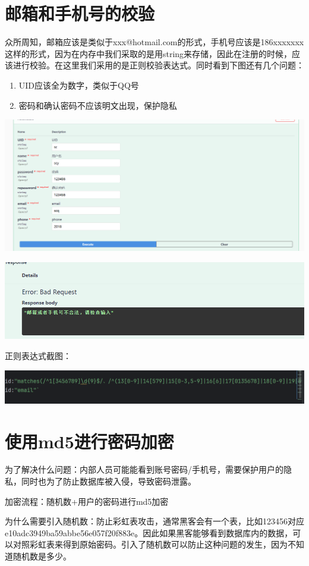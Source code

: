 \documentclass[12pt]{article}
\begin{document}
	
	\section{邮箱和手机号的校验}
	众所周知，邮箱应该是类似于xxx@hotmail.com的形式，手机号应该是186xxxxxxx这样的形式，因为在内存中我们采取的是用string来存储，因此在注册的时候，应该进行校验。在这里我们采用的是正则校验表达式。同时看到下图还有几个问题：
	\begin{enumerate}
		\item UID应该全为数字，类似于QQ号
		\item 密码和确认密码不应该明文出现，保护隐私
	\end{enumerate}
	
	\includegraphics{16.png}
	
	\includegraphics{17.png}
	
	正则表达式截图：
	
	\includegraphics{18.png}
	
	\section{使用md5进行密码加密}
	为了解决什么问题：内部人员可能能看到账号密码/手机号，需要保护用户的隐私，同时也为了防止数据库被入侵，导致密码泄露。
	
	加密流程：随机数+用户的密码进行md5加密
	
	为什么需要引入随机数：防止彩虹表攻击，通常黑客会有一个表，比如123456对应e10adc3949ba59abbe56e057f20f883e。因此如果黑客能够看到数据库内的数据，可以对照彩虹表来得到原始密码。引入了随机数可以防止这种问题的发生，因为不知道随机数是多少。
	
\end{document}
